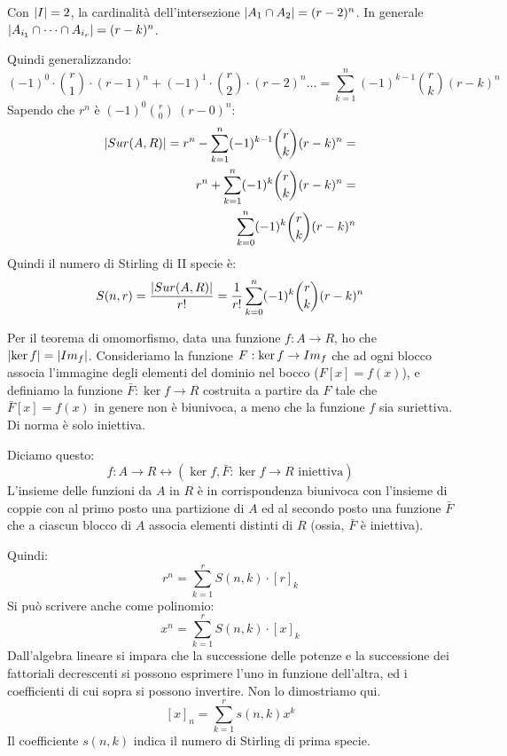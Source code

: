 Con $\left\lvert{I}\right\rvert = 2$, la cardinalit\`a dell'intersezione $\left\lvert{A_1 \cap A_2}\right\rvert = (r - 2)^n$. In generale $\left\lvert{A_{i_1} \cap \dots \cap A_{i_r}}\right\rvert = (r - k)^n$.

Quindi generalizzando:
\[
(-1)^0 \cdot \binom{r}{1} \cdot (r-1)^n + 
(-1)^1 \cdot \binom{r}{2} \cdot (r-2)^n \dots =
\sum_{k = 1}^{n} (-1)^{k - 1} \binom{r}{k} (r - k)^n
\]
Sapendo che $r^n$ \`e $(-1)^0 \binom{r}{0} \ (r - 0)^n$:
\begin{align*}
\left\lvert{Sur(A,R)}\right\rvert = 
r^n - \sum_{k = 1}^{n} (-1)^{k - 1} \binom{r}{k} (r - k)^n =  \\
r^n + \sum_{k = 1}^{n} (-1)^{k} \binom{r}{k} (r - k)^n =  \\
\sum_{k = 0}^{n} (-1)^{k} \binom{r}{k} (r - k)^n
\end{align*}
Quindi il numero di Stirling di II specie \`e:
\begin{equation}
S(n,r) = \frac{\left\lvert{Sur(A,R)}\right\rvert}{r!} = \frac{1}{r!} \sum_{k = 0}^{n} (-1)^{k} \binom{r}{k} (r - k)^n
\end{equation}

Per il teorema di omomorfismo, data una funzione $f : A \to R$, ho che $\left\lvert{\ker f}\right\rvert = \left\lvert{Im_{f}}\right\rvert$. Consideriamo la funzione $F : \ker f \to Im_{f}$ che ad ogni blocco associa l'immagine degli elementi del dominio nel bocco ($F[x] = f(x)$), e definiamo la funzione $\bar F : \ker f \to R$ costruita a partire da $F$ tale che $\bar F [x] = f(x)$ in genere non \`e biunivoca, a meno che la funzione $f$ sia suriettiva. Di norma \`e solo iniettiva.

Diciamo questo:
\begin{equation}
f : A \to R \leftrightarrow ( \ker f , \bar F : \ker f \to R \text{ iniettiva})
\end{equation}
L'insieme delle funzioni da $A$ in $R$ \`e in corrispondenza biunivoca con l'insieme di coppie con al primo posto una partizione di $A$ ed al secondo posto una funzione $\bar F$ che a ciascun blocco di $A$ associa elementi distinti di $R$ (ossia, $\bar F$ \`e iniettiva).

Quindi:
\[
r^n = \sum_{k = 1}^{r} S(n, k) \cdot [r]_k
\]
Si pu\`o scrivere anche come polinomio:
\[
x^n = \sum_{k = 1}^{r} S(n, k) \cdot [x]_k
\]
Dall'algebra lineare si impara che la successione delle potenze e la successione dei fattoriali decrescenti si possono esprimere l'uno in funzione dell'altra, ed i coefficienti di cui sopra si possono invertire. Non lo dimostriamo qui.
\[
[x]_n = \sum_{k = 1}^{r} s(n, k) x^k
\]
Il coefficiente $s(n, k)$ indica il numero di Stirling di prima specie.

